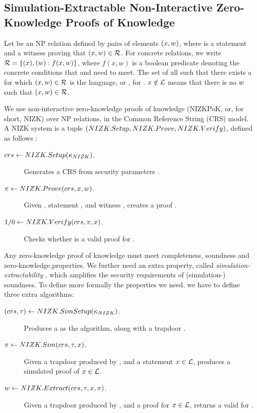 \subsection{Simulation-Extractable Non-Interactive Zero-Knowledge
  Proofs of Knowledge}
\label{sapp:nizk}

Let \NIZKRel be an NP relation defined by pairs of elements $(x,w)$,
where \NIZKx is a statement and \NIZKw a witness proving that $(x,w)
\in \mathcal{R}$. For concrete relations, we write $\mathcal{R} = \lbrace (x),
(w): f(x,w) \rbrace$, where $f(x,w)$ is a boolean predicate denoting the
concrete conditions that \NIZKx and \NIZKw need to meet. The set of all \NIZKx
such that there exists a \NIZKw for which $(x,w) \in \mathcal{R}$ is the
language, or \NIZKLang, for \NIZKRel. $x \notin \mathcal{L}$ means that
there is no $w$ such that $(x,w) \in \mathcal{R}$.

We use non-interactive zero-knowledge proofs of knowledge (NIZKPoK, or, for
short, NIZK) over NP relations, in the Common Reference String (CRS) model. A
NIZK system is a tuple $(NIZK.Setup,NIZK.Prove,NIZK.Verify)$, defined as follows
\cite{gos06}:

\begin{description}
\item[$crs \gets NIZK.Setup(\kappa_{NIZK})$.] Generates a CRS \NIZKcrs from
  security parameters \NIZKsecpar.
\item[$\pi \gets NIZK.Prove(crs,x,w)$.] Given \NIZKcrs,
  statement \NIZKx, and witness \NIZKw, creates a proof \NIZKproof.
\item[$1/0 \gets NIZK.Verify(crs,\pi,x)$.] Checks whether
  \NIZKproof is a valid proof for \NIZKx.
\end{description}

Any zero-knowledge proof of knowledge must meet completeness, soundness and
zero-knowledge,properties. We further need an extra property, called
\emph{simulation-extractability} \cite{cl06}, which amplifies the security
requirements of (simulation-) soundness.
%
To define more formally the properties we need, we have to define three extra
algorithms:

\begin{description}
\item[$(crs,\tau) \gets NIZK.SimSetup(\kappa_{NIZK})$.] Produces a
  \NIZKcrs as the \NIZKSetup algorithm, along with a trapdoor \NIZKtrap.
\item[$\pi \gets NIZK.Sim(crs,\tau,x)$.] Given a trapdoor
  \NIZKtrap produced by \NIZKSimSetup, and a statement $x \in \mathcal{L}$,
  produces a simulated proof \NIZKproof of $x \in \mathcal{L}$.
\item[$w \gets NIZK.Extract(crs,\tau,x,\pi)$.] Given
  a trapdoor \NIZKtrap produced by \NIZKSimSetup, and a proof \NIZKproof for
  $x \in \mathcal{L}$, returns a valid \NIZKw for \NIZKx.
\end{description}

